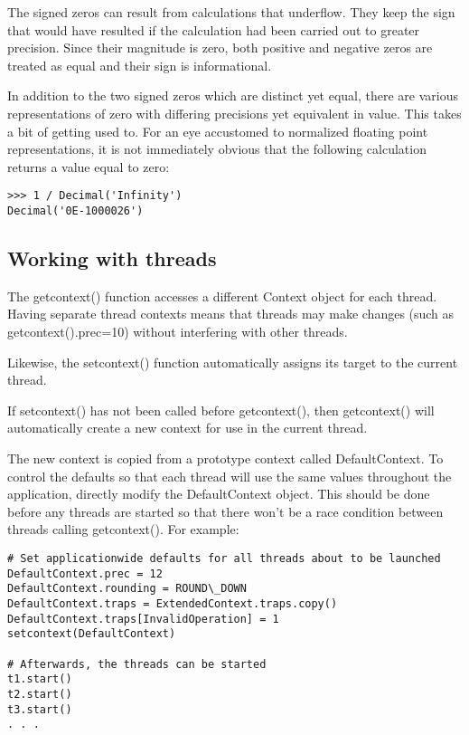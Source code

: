 \vpara
The signed zeros can result from calculations that underflow. They keep the sign that would have resulted if the calculation had been carried out to greater precision. Since their magnitude is zero, both positive and negative zeros are treated as equal and their sign is informational.

\vpara
In addition to the two signed zeros which are distinct yet equal, there are various representations of zero with differing precisions yet equivalent in value. This takes a bit of getting used to. For an eye accustomed to normalized floating point representations, it is not immediately obvious that the following calculation returns a value equal to zero:

\begin{lstlisting}
>>> 1 / Decimal('Infinity')
Decimal('0E-1000026')
\end{lstlisting}

\subsection{Working with threads}

The getcontext() function accesses a different Context object for each thread. Having separate thread contexts means that threads may make changes (such as getcontext().prec=10) without interfering with other threads.

\vpara
Likewise, the setcontext() function automatically assigns its target to the current thread.

\vpara
If setcontext() has not been called before getcontext(), then getcontext() will automatically create a new context for use in the current thread.

\vpara
The new context is copied from a prototype context called DefaultContext. To control the defaults so that each thread will use the same values throughout the application, directly modify the DefaultContext object. This should be done before any threads are started so that there won’t be a race condition between threads calling getcontext(). For example:

\begin{lstlisting}
# Set applicationwide defaults for all threads about to be launched
DefaultContext.prec = 12
DefaultContext.rounding = ROUND\_DOWN
DefaultContext.traps = ExtendedContext.traps.copy()
DefaultContext.traps[InvalidOperation] = 1
setcontext(DefaultContext)

# Afterwards, the threads can be started
t1.start()
t2.start()
t3.start()
. . .
\end{lstlisting}


